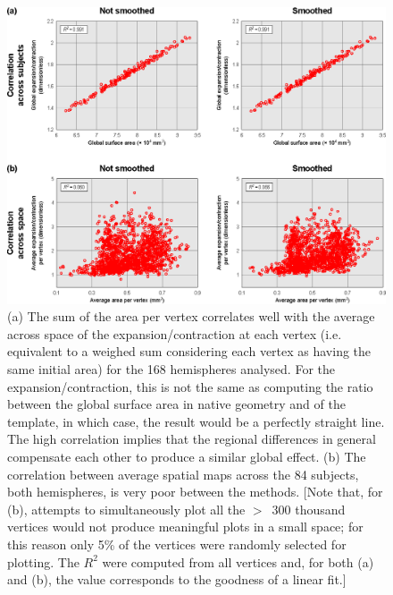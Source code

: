 \begin{figure}[!tp]  %
\centering
\includegraphics[width=14cm]{images/scatter.eps}
\caption[Comparison with expansion/contraction methods (\textsc{ii}).]{(a) The sum of the area per vertex correlates well with the average across space of the expansion/contraction at each vertex (i.e. equivalent to a weighed sum considering each vertex as having the same initial area) for the 168 hemispheres analysed. For the expansion/contraction, this is not the same as computing the ratio between the global surface area in native geometry and of the template, in which case, the result would be a perfectly straight line. The high correlation implies that the regional differences in general compensate each other to produce a similar global effect. (b) The correlation between average spatial maps across the 84 subjects, both hemispheres, is very poor between the methods. [Note that, for (b), attempts to simultaneously plot all the $>$~300 thousand vertices would not produce meaningful plots in a small space; for this reason only 5\% of the vertices were randomly selected for plotting. The $R^2$ were computed from all vertices and, for both (a) and (b), the value corresponds to the goodness of a linear fit.]}
\label{fig:scatter}
\end{figure}

